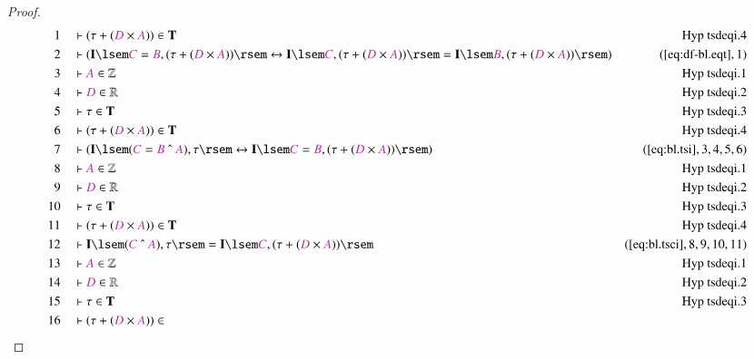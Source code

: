 \begin{proof}
\begin{align}
  1 &&  & \vdash ( \tau + ( \mc{D} \times \mc{A} ) ) \in
      \mathbf{T}&\text{Hyp~tsdeqi.4}\notag%
  \\ 2 &&  & \vdash ( \mathbf{I} \lsem \mc{C} = \mc{B} , ( \tau + ( \mc{D}
      \times \mc{A} ) ) \rsem \leftrightarrow \mathbf{I}
      \lsem \mc{C} , ( \tau + ( \mc{D} \times \mc{A} ) )
      \rsem = \mathbf{I} \lsem \mc{B} , ( \tau + ( \mc{D}
      \times \mc{A} ) ) \rsem
      )&(\mbox{\ref{eq:df-bl.eqt}},1)\notag
  \\ 3 &&  & \vdash \mc{A} \in \mathbb{Z}&\text{Hyp~tsdeqi.1}\notag%
  \\ 4 &&  & \vdash \mc{D} \in \mathbb{R}&\text{Hyp~tsdeqi.2}\notag%
  \\ 5 &&  & \vdash \tau \in \mathbf{T}&\text{Hyp~tsdeqi.3}\notag%
  \\ 6 &&  & \vdash ( \tau + ( \mc{D} \times \mc{A} ) ) \in
      \mathbf{T}&\text{Hyp~tsdeqi.4}\notag%
  \\ 7 &&  & \vdash ( \mathbf{I} \lsem ( \mc{C} = \mc{B} ~\string^~ \mc{A} ) ,
      \tau \rsem \leftrightarrow \mathbf{I} \lsem \mc{C} =
      \mc{B} , ( \tau + ( \mc{D} \times \mc{A} ) ) \rsem
      )&(\mbox{\ref{eq:bl.tsi}},3,4,5,6)\notag
  \\ 8 &&  & \vdash \mc{A} \in \mathbb{Z}&\text{Hyp~tsdeqi.1}\notag%
  \\ 9 &&  & \vdash \mc{D} \in \mathbb{R}&\text{Hyp~tsdeqi.2}\notag%
  \\ 10 &&  & \vdash \tau \in \mathbf{T}&\text{Hyp~tsdeqi.3}\notag%
  \\ 11 &&  & \vdash ( \tau + ( \mc{D} \times \mc{A} ) ) \in
      \mathbf{T}&\text{Hyp~tsdeqi.4}\notag%
  \\ 12 &&  & \vdash \mathbf{I} \lsem ( \mc{C} ~\string^~ \mc{A} ) , \tau \rsem
      = \mathbf{I} \lsem \mc{C} , ( \tau + ( \mc{D} \times
      \mc{A} ) )
      \rsem&(\mbox{\ref{eq:bl.tsci}},8,9,10,11)\notag
  \\ 13 &&  & \vdash \mc{A} \in
      \mathbb{Z}&\text{Hyp~tsdeqi.1}\notag%
  \\ 14 &&  & \vdash \mc{D} \in
      \mathbb{R}&\text{Hyp~tsdeqi.2}\notag%
  \\ 15 &&  & \vdash \tau \in \mathbf{T}&\text{Hyp~tsdeqi.3}\notag%
  \\ 16 &&  & \vdash ( \tau + ( \mc{D} \times \mc{A} ) ) \in

\end{align}
\end{proof}
